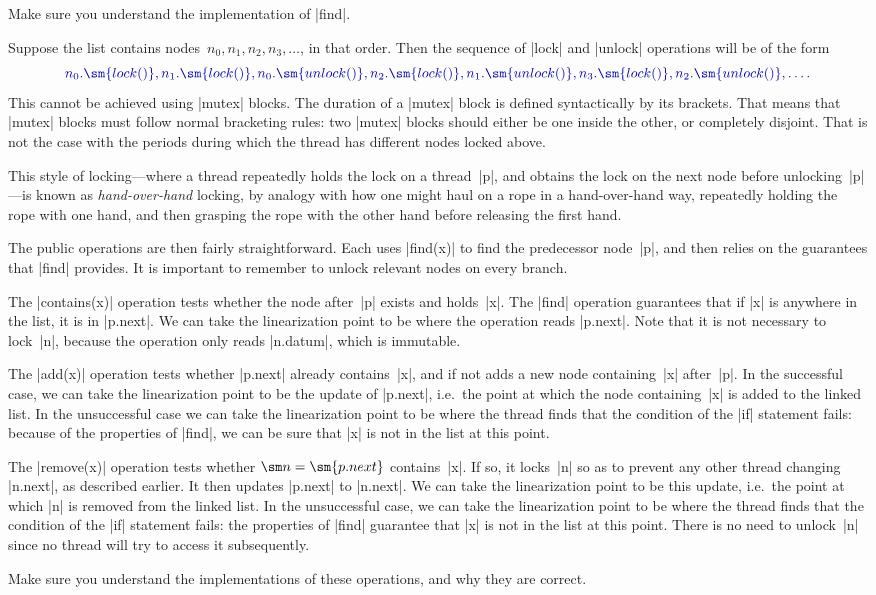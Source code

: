 \begin{instruction}
Make sure you understand the implementation of |find|.
\end{instruction}

Suppose the list contains nodes~$n_0, n_1, n_2, n_3, \ldots$, in that order.
Then the sequence of |lock| and |unlock| operations will be of the form
\[\mstyle
n_0.\sm{lock()}, n_1.\sm{lock()}, n_0.\sm{unlock()}, n_2.\sm{lock()},
n_1.\sm{unlock()}, n_3.\sm{lock()}, n_2.\sm{unlock()}, \ldots.
\]
This cannot be achieved using |mutex| blocks.  The duration of a |mutex| block
is defined syntactically by its brackets.  That means that |mutex| blocks must
follow normal bracketing rules: two |mutex| blocks should either be one inside
the other, or completely disjoint.  That is not the case with the periods
during which the thread has different nodes locked above.

This style of locking---where a thread repeatedly holds the lock on a
thread~|p|, and obtains the lock on the next node before unlocking~|p|---is
known as \emph{hand-over-hand} locking, by analogy with how one might haul on
a rope in a hand-over-hand way, repeatedly holding the rope with one hand, and
then grasping the rope with the other hand before releasing the first hand.

The public operations are then fairly straightforward.  Each uses |find(x)| to
find the predecessor node~|p|, and then relies on the guarantees that |find|
provides.  It is important to remember to unlock relevant nodes on every
branch. 

The |contains(x)| operation tests whether the node after~|p| exists
and holds~|x|.  The |find| operation guarantees that if |x| is anywhere in the
list, it is in |p.next|.  We can take the linearization point to be where the
operation reads |p.next|.  Note that it is not necessary to lock~|n|, because
the operation only reads |n.datum|, which is immutable. 

The |add(x)| operation tests whether |p.next| already contains~|x|, and if not
adds a new node containing~|x| after~|p|.  In the successful case, we can take
the linearization point to be the update of |p.next|, i.e.~the point at which
the node containing~|x| is added to the linked list.  In the unsuccessful case
we can take the linearization point to be where the thread finds that the
condition of the |if| statement fails: because of the properties of |find|, we
can be sure that |x| is not in the list at this point.  

The |remove(x)| operation tests whether $\sm n = \sm{p.next}$ contains~|x|.
If so, it locks~|n| so as to prevent any other thread changing |n.next|, as
described earlier.  It then updates |p.next| to |n.next|.  We can take the
linearization point to be this update, i.e.~the point at which |n| is removed
from the linked list.  In the unsuccessful case, we can take the linearization
point to be where the thread finds that the condition of the |if| statement
fails: the properties of |find| guarantee that |x| is not in the list at this
point.  There is no need to unlock~|n| since no thread will try to access it
subsequently. 

\begin{instruction}
Make sure you understand the implementations of these operations, and why they
are correct.
\end{instruction}

